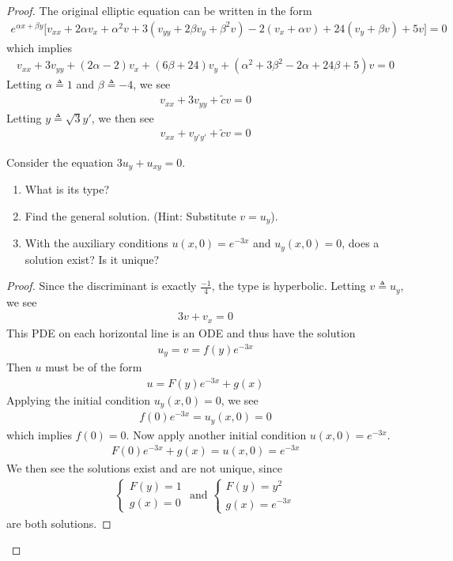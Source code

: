 \documentclass{report}
\begin{document}
\begin{proof}
The original elliptic equation can be written in the form 
\begin{align*}
e^{\alpha x+ \beta  y}\Big[ v_{xx}+2\alpha v_x+ \alpha^2 v +3 (v_{yy}+2\beta  v_y + \beta ^2 v) -2(v_x + \alpha v)+24 (v_y+\beta v)+5v \Big]=0
\end{align*}
which implies 
\begin{align*}
v_{xx}+3v_{yy}+(2\alpha -2)v_x+ (6 \beta  +24)v_y + (\alpha ^2 +3\beta ^2 -2\alpha +24 \beta  +5)v=0 
\end{align*}
Letting $\alpha \triangleq 1$ and $\beta  \triangleq -4$, we see 
\begin{align*}
v_{xx}+3v_{yy}+ \tilde{c}v =0 
\end{align*}
Letting $y\triangleq \sqrt{3}y' $, we then see 
\begin{align*}
v_{xx}+v_{y'y'}+\tilde{c}v=0 
\end{align*}
\begin{question}{}{}
Consider the equation $3u_y+u_{xy}=0$.
\begin{enumerate}[label=(\alph*)]
  \item What is its type? 
  \item Find the general solution. (Hint: Substitute $v=u_y$).
  \item With the auxiliary conditions $u(x,0)=e^{-3x}$ and $u_{y}(x,0)=0$, does a solution exist? Is it unique? 
\end{enumerate}
\end{question}
\begin{proof}
Since the discriminant is exactly $\frac{-1}{4}$, the type is hyperbolic. Letting $v\triangleq u_y$, we see 
\begin{align*}
3v+v_x=0
\end{align*}
This PDE on each horizontal line is an ODE and thus have the solution 
\begin{align*}
u_y=v=f(y)e^{-3x}
\end{align*}
Then $u$ must be of the form 
\begin{align*}
u=F(y)e^{-3x}+ g(x)
\end{align*}
Applying the initial condition $u_y(x,0)=0$, we see 
\begin{align*}
f(0)e^{-3x}=u_y(x,0)=0
\end{align*}
which implies $f(0)=0$. Now apply another initial condition $u(x,0)=e^{-3x}$. 
\begin{align*}
F(0)e^{-3x}+g(x)=u(x,0)=e^{-3x}
\end{align*}
We then see the solutions exist and are not unique, since 
\begin{align*}
\begin{cases}
  F(y)=1\\
  g(x)=0
\end{cases}\text{ and }\begin{cases}
  F(y)=y^2\\
  g(x)=e^{-3x}
\end{cases}
\end{align*}
are both solutions. 
\end{proof}

\end{proof}
\end{document}
